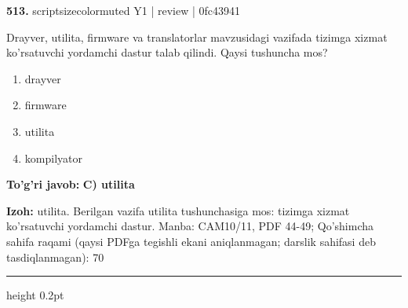 \documentclass[10pt,a4paper]{article}
\begin{document}
{\bfseries\sffamily\color{ink} 513.} {scriptsizecolor{muted} Y1 | review | 0fc43941}
\par
Drayver, utilita, firmware va translatorlar mavzusidagi vazifada tizimga xizmat ko'rsatuvchi yordamchi dastur talab qilindi. Qaysi tushuncha mos?
\begin{enumerate}[label=\Alph*),leftmargin=9mm]
\item drayver
\item firmware
\item utilita
\item kompilyator
\end{enumerate}
\begin{tcolorbox}[enhanced,breakable,colback=teal!4,colframe=teal!60!black,boxrule=0.45pt,arc=1.2mm,left=2.7mm,right=2.7mm,top=1.8mm,bottom=1.8mm,before skip=2mm,after skip=2mm]
{\bfseries\sffamily\color{teal}To'g'ri javob:} \textbf{C) utilita}
\par\smallskip
{\bfseries Izoh:} utilita. Berilgan vazifa utilita tushunchasiga mos: tizimga xizmat ko'rsatuvchi yordamchi dastur. Manba: CAM10/11, PDF 44-49; Qo'shimcha sahifa raqami (qaysi PDFga tegishli ekani aniqlanmagan; darslik sahifasi deb tasdiqlanmagan): 70
\end{tcolorbox}
\vspace{2mm}\hrule height 0.2pt\vspace{3mm}
\end{document}
